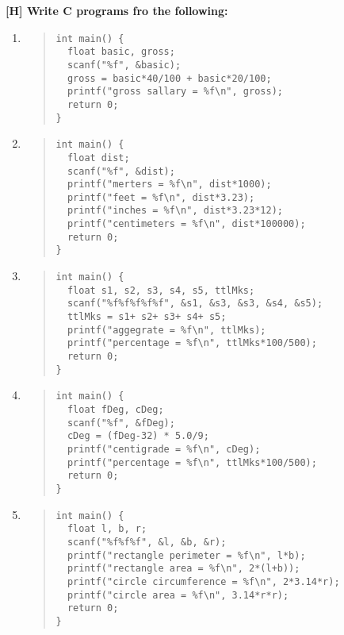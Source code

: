 \documentclass{report}
\begin{document}
\textbf{[H] Write C programs fro the following:}
\begin{enumerate}
    \renewcommand{\labelenumi}{\alph{enumi}}
  \item \begin{quote} \begin{verbatim}
int main() {
  float basic, gross;
  scanf("%f", &basic);
  gross = basic*40/100 + basic*20/100;
  printf("gross sallary = %f\n", gross);
  return 0;
}

  \end{verbatim} \end{quote} 

  \item \begin{quote} \begin{verbatim}
int main() {
  float dist;
  scanf("%f", &dist);
  printf("merters = %f\n", dist*1000);
  printf("feet = %f\n", dist*3.23);
  printf("inches = %f\n", dist*3.23*12);
  printf("centimeters = %f\n", dist*100000);
  return 0;
}
  \end{verbatim} \end{quote} 

  \item \begin{quote} \begin{verbatim}
int main() {
  float s1, s2, s3, s4, s5, ttlMks;
  scanf("%f%f%f%f%f", &s1, &s3, &s3, &s4, &s5);
  ttlMks = s1+ s2+ s3+ s4+ s5;
  printf("aggegrate = %f\n", ttlMks);
  printf("percentage = %f\n", ttlMks*100/500);
  return 0;
}
  \end{verbatim} \end{quote} 

  \item \begin{quote} \begin{verbatim}
int main() {
  float fDeg, cDeg;
  scanf("%f", &fDeg);
  cDeg = (fDeg-32) * 5.0/9;
  printf("centigrade = %f\n", cDeg);
  printf("percentage = %f\n", ttlMks*100/500);
  return 0;
}
  \end{verbatim} \end{quote} 

  \item \begin{quote} \begin{verbatim}
int main() {
  float l, b, r;
  scanf("%f%f%f", &l, &b, &r);
  printf("rectangle perimeter = %f\n", l*b);
  printf("rectangle area = %f\n", 2*(l+b));
  printf("circle circumference = %f\n", 2*3.14*r);
  printf("circle area = %f\n", 3.14*r*r);
  return 0;
}
  \end{verbatim} \end{quote} 


\end{enumerate}
\end{document}
